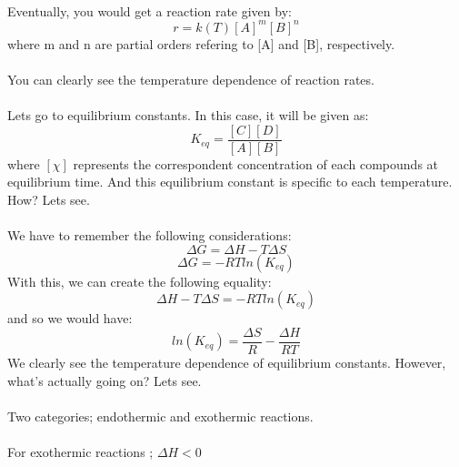 \documentclass[12pt,  letterpaper]{article}
\begin{document}
\paragraph*{}
Eventually, you would get a reaction rate given by:
\begin{equation}
r = k(T)[A]^{m}[B]^{n}
\end{equation}
where m and n are partial orders refering to [A] and [B], respectively.
\paragraph*{}
You can clearly see the temperature dependence of reaction rates.
\paragraph*{}
Lets go to equilibrium constants. In this case, it will be given as:
\begin{equation}
K_{eq} = \frac{[C][D]}{[A][B]}
\end{equation}
where $[\chi]$ represents the correspondent concentration of each compounds at equilibrium time. And this equilibrium constant is specific to each temperature. How? Lets see.
\paragraph*{}
We have to remember the following considerations:
\begin{equation}
\Delta G = \Delta H - T\Delta S
\end{equation}
\begin{equation}
\Delta G = -RTln(K_{eq})
\end{equation}
With this, we can create the following equality:
\begin{equation}
\Delta H - T\Delta S = -RTln(K_{eq})
\end{equation}
and so we would have:
\begin{equation}
ln(K_{eq}) = \frac{\Delta S}{R} - \frac{\Delta H}{RT}
\end{equation}
We clearly see the temperature dependence of equilibrium constants. However, what's actually going on? Lets see.
\paragraph*{}
Two categories; endothermic and exothermic reactions.
\paragraph*{}
For exothermic reactions ; $\Delta H < 0$
\end{document}
